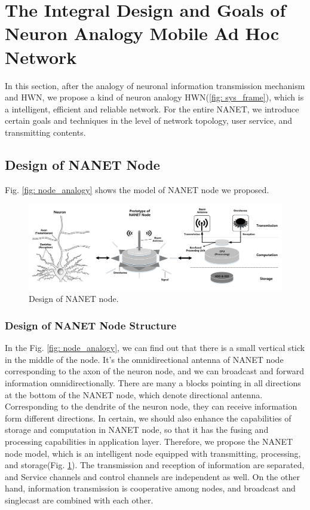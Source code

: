 \documentclass[journal,comsoc]{IEEEtran}
\begin{document}
	
	\section{The Integral Design and Goals of Neuron Analogy Mobile Ad Hoc Network}
	\label{section: general_design}
	In this section, after the analogy of neuronal information transmission mechanism and HWN, 
	we propose a kind of neuron analogy HWN(\ref{fig: sys_frame}), which is a intelligent, efficient and reliable network.
	For the entire NANET, we introduce certain goals and techniques in the level of network topology, user service, and transmitting contents.
	
	\subsection{Design of NANET Node}
	Fig. \ref{fig: node_analogy} shows the model of NANET node we proposed.
	\begin{figure}[htbp]
		\centering
		\includegraphics[width=0.95\linewidth]{figures/node_model.pdf}
		\caption{Design of NANET node.}	
		\label{fig: NANET_node}
	\end{figure}
	
	\subsubsection{Design of NANET Node Structure}
	
	In the Fig. \ref{fig: node_analogy}, we can find out that there is a small vertical stick in the middle of the node. 
	It's the omnidirectional antenna of NANET node corresponding to the axon of the neuron node, and we can broadcast and forward information omnidirectionally.
	There are many a blocks pointing in all directions at the bottom of the NANET node, which denote directional antenna. 
	Corresponding to the dendrite of the neuron node, they can receive information form different directions.
	In certain, we should also enhance the capabilities of storage and computation  in NANET node, so that it has the fusing and processing capabilities in application layer.
	Therefore, we propose the NANET node model, 
	which is an intelligent node equipped with transmitting, processing, and storage(Fig. \ref{fig: NANET_node}).
	The transmission and reception of information are separated, and Service channels and control channels are independent as well.
	On the other hand, information transmission is cooperative among nodes,  and broadcast and singlecast are combined with each other.
	
\end{document}
